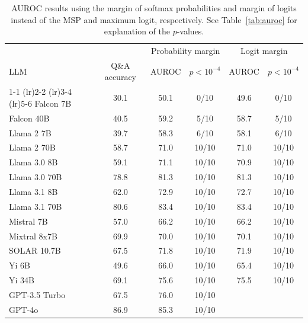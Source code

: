 \begin{table}[h]
\caption{AUROC results using the margin of softmax probabilities and margin of logits instead of the MSP and maximum logit, respectively. See Table~\ref{tab:auroc} for explanation of the $p$-values.}
\label{tab:auroc_margin}
\centering
\begin{tabular}{lccccc}
\toprule
& & \multicolumn{2}{c}{Probability margin} & \multicolumn{2}{c}{Logit margin} \\ 
LLM & Q\&A accuracy & AUROC & $p < 10^{-4}$ & AUROC & $p < 10^{-4}$ \\ 
\cmidrule(lr){1-1} \cmidrule(lr){2-2} \cmidrule(lr){3-4} \cmidrule(lr){5-6} 
Falcon 7B & 30.1 & 50.1 & 0/10 & 49.6 & 0/10\\
Falcon 40B & 40.5 & 59.2 & 5/10 & 58.7 & 5/10\\
Llama 2 7B & 39.7 & 58.3 & 6/10 & 58.1 & 6/10\\
Llama 2 70B & 58.7 & 71.0 & 10/10 & 71.0 & 10/10\\
Llama 3.0 8B & 59.1 & 71.1 & 10/10 & 70.9 & 10/10\\
Llama 3.0 70B & 78.8 & 81.3 & 10/10 & 81.3 & 10/10\\
Llama 3.1 8B & 62.0 & 72.9 & 10/10 & 72.7 & 10/10\\
Llama 3.1 70B & 80.6 & 83.4 & 10/10 & 83.4 & 10/10\\
Mistral 7B & 57.0 & 66.2 & 10/10 & 66.2 & 10/10\\
Mixtral 8x7B & 69.9 & 70.0 & 10/10 & 70.1 & 10/10\\
SOLAR 10.7B & 67.5 & 71.8 & 10/10 & 71.9 & 10/10\\
Yi 6B & 49.6 & 66.0 & 10/10 & 65.4 & 10/10\\
Yi 34B & 69.1 & 75.6 & 10/10 & 75.5 & 10/10\\
GPT-3.5 Turbo & 67.5 & 76.0 & 10/10 &  &\\
GPT-4o & 86.9 & 85.3 & 10/10 & & \\
\bottomrule
\end{tabular}
\end{table}

